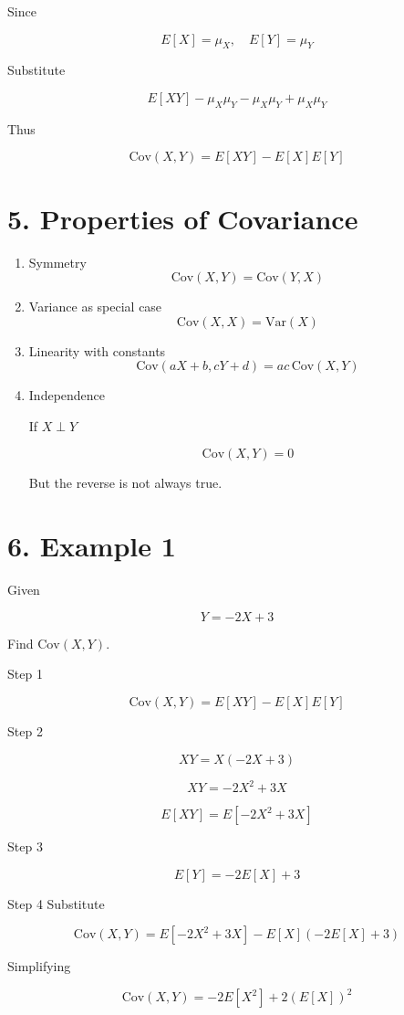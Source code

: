 \documentclass[12pt]{article}
\begin{document}
Since

\[
E[X]=\mu_X, \quad E[Y]=\mu_Y
\]

Substitute

\[
E[XY]-\mu_X\mu_Y-\mu_X\mu_Y+\mu_X\mu_Y
\]

Thus

\[
\boxed{\text{Cov}(X,Y)=E[XY]-E[X]E[Y]}
\]

\section*{5. Properties of Covariance}

\begin{enumerate}
\item Symmetry
\[
\text{Cov}(X,Y)=\text{Cov}(Y,X)
\]

\item Variance as special case
\[
\text{Cov}(X,X)=\text{Var}(X)
\]

\item Linearity with constants
\[
\text{Cov}(aX+b,cY+d)=ac\,\text{Cov}(X,Y)
\]

\item Independence

If $X \perp Y$

\[
\text{Cov}(X,Y)=0
\]

But the reverse is not always true.
\end{enumerate}

\section*{6. Example 1}

Given

\[
Y=-2X+3
\]

Find $\text{Cov}(X,Y)$.

Step 1

\[
\text{Cov}(X,Y)=E[XY]-E[X]E[Y]
\]

Step 2

\[
XY=X(-2X+3)
\]

\[
XY=-2X^2+3X
\]

\[
E[XY]=E[-2X^2+3X]
\]

Step 3

\[
E[Y]=-2E[X]+3
\]

Step 4 Substitute

\[
\text{Cov}(X,Y)=E[-2X^2+3X]-E[X](-2E[X]+3)
\]

Simplifying

\[
\text{Cov}(X,Y)=-2E[X^2]+2(E[X])^2
\]
\end{document}
